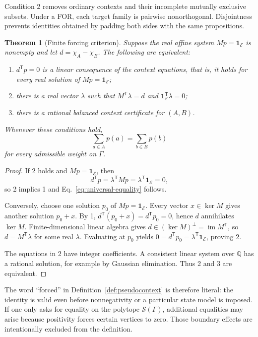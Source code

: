 \documentclass[
  twocolumn,
  aps,
  pra,
  floatfix,
  amsmath,amssymb,
  longbibliography
]{revtex4-2}
\newtheorem{theorem}{Theorem}
\theoremstyle{definition}
\theoremstyle{remark}
\newcommand{\E}{\mathcal E}
\newcommand{\one}{\mathbf 1}
\begin{document}
Condition 2 removes ordinary contexts and their incomplete mutually
exclusive subsets.  Under a FOR, each target family is
pairwise nonorthogonal.  Disjointness prevents identities obtained by padding
both sides with the same propositions.

\begin{theorem}[Finite forcing criterion]
\label{thm:forcing}
Suppose the real affine system $Mp=\one_\E$ is nonempty and let
$d=\chi_A-\chi_B$.  The following are equivalent:
\begin{enumerate}
  \item $d^{\mathsf T}p=0$ is a linear consequence of the context equations,
        that is, it holds for every real solution of
        $Mp=\one_\E$;
  \item there is a real vector $\lambda$ such that
        $M^{\mathsf T}\lambda=d$ and
        $\one_\E^{\mathsf T}\lambda=0$;
  \item there is a rational balanced context certificate for $(A,B)$.
\end{enumerate}
Whenever these conditions hold,
\begin{equation}
  \sum_{a\in A}p(a)=\sum_{b\in B}p(b)
  \label{eq:universal-equality}
\end{equation}
for every admissible weight on $\Gamma$.
\end{theorem}

\begin{proof}
If 2 holds and $Mp=\one_\E$, then
\[
 d^{\mathsf T}p
 =\lambda^{\mathsf T}Mp
 =\lambda^{\mathsf T}\one_\E
 =0,
\]
so 2 implies 1 and Eq.~\eqref{eq:universal-equality} follows.

Conversely, choose one solution $p_0$ of $Mp=\one_\E$.  Every vector
$x\in\ker M$ gives another solution $p_0+x$.  By 1,
$d^{\mathsf T}(p_0+x)=d^{\mathsf T}p_0=0$, hence $d$ annihilates
$\ker M$.  Finite-dimensional linear algebra gives
$d\in(\ker M)^\perp=\operatorname{im}M^{\mathsf T}$, so
$d=M^{\mathsf T}\lambda$ for some real $\lambda$.  Evaluating at $p_0$
yields
$0=d^{\mathsf T}p_0=\lambda^{\mathsf T}\one_\E$, proving 2.

The equations in 2 have integer coefficients.  A consistent linear system
over $\mathbb Q$ has a rational solution, for example by Gaussian
elimination.  Thus 2 and 3 are equivalent.
\end{proof}

The word ``forced'' in Definition~\ref{def:pseudocontext} is therefore literal: the identity is
valid even before nonnegativity or a particular state model is imposed.  If
one only asks for equality on the polytope $\mathcal S(\Gamma)$, additional
equalities may arise because positivity forces certain vertices to zero.
Those boundary effects are intentionally excluded from the definition.
\end{document}
